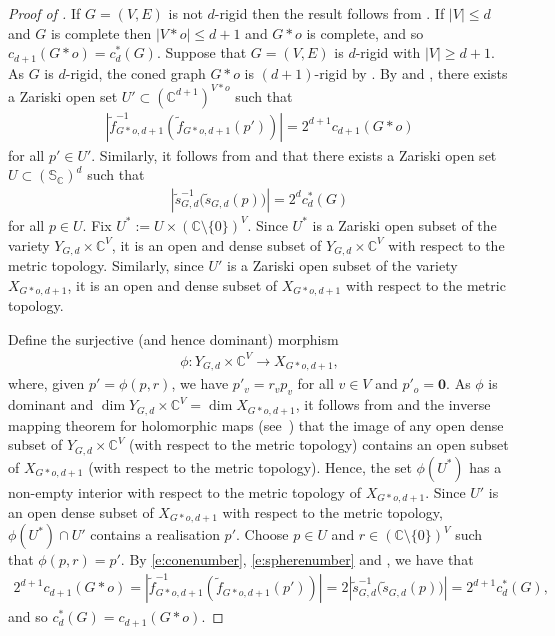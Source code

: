 \documentclass[11pt]{article}
\theoremstyle{definition}
\numberwithin{equation}{section}
\begin{document}
\begin{proof}[Proof of ]
	If $G=(V,E)$ is not $d$-rigid then the result follows from .
	If $|V| \leq d$ and $G$ is complete then $|V*o| \leq d+1$ and $G*o$ is complete,
	and so $c_{d+1}(G*o) = c^*_d(G)$.
	Suppose that $G=(V,E)$ is $d$-rigid with $|V| \geq d+1$.	
	As $G$ is $d$-rigid, the coned graph $G*o$ is $(d+1)$-rigid by .
	By  and ,
	there exists a Zariski open set $U' \subset (\mathbb{C}^{d+1})^{V*o}$ such that
	\begin{align}\label{e:conenumber}
		\left| \tilde{f}_{G*o,d+1}^{-1} \left(\tilde{f}_{G*o,d+1}(p') \right) \right| = 2^{d+1} c_{d+1}(G*o)
	\end{align}
	for all $p' \in U'$.
	Similarly, it follows from  and  that there exists a Zariski open set $U \subset (\mathbb{S}_\mathbb{C})^{d}$ such that
	\begin{align}\label{e:spherenumber}
		\left| \tilde{s}_{G,d}^{-1} \Big(\tilde{s}_{G,d}(p) \Big) \right| = 2^{d} c_{d}^*(G)
	\end{align}
	for all $p \in U$.
	Fix $U^* := U \times (\mathbb{C} \setminus \{0\})^V$.
	Since $U^*$ is a Zariski open subset of the variety $Y_{G,d} \times \mathbb{C}^V$,
	it is an open and dense subset of $Y_{G,d} \times \mathbb{C}^V$ with respect to the metric topology.
	Similarly,
	since $U'$ is a Zariski open subset of the variety $ X_{G *o,d+1}$,
	it is an open and dense subset of $X_{G *o,d+1}$ with respect to the metric topology.
	
	Define the surjective (and hence dominant) morphism 
	\begin{align*}
		\phi : Y_{G,d} \times \mathbb{C}^V \rightarrow X_{G *o,d+1},
	\end{align*}
	where, given $p'= \phi(p,r)$,
	we have $p'_v=r_vp_v$ for all $v \in V$ and $p'_o=\mathbf{0}$.
	As $\phi$ is dominant and $\dim Y_{G,d} \times \mathbb{C}^V = \dim X_{G *o,d+1}$,
	it follows from  and the inverse mapping theorem for holomorphic maps (see~\cite[Theorem 7.5]{FG02}) that the image of any open dense subset of $Y_{G,d} \times \mathbb{C}^V$ (with respect to the metric topology) contains an open subset of $X_{G*o,d+1}$ (with respect to the metric topology).
	Hence, the set $\phi( U^*)$ has a non-empty interior with respect to the metric topology of $X_{G*o,d+1}$.
	Since $U'$ is an open dense subset of $X_{G*o,d+1}$ with respect to the metric topology,
	$\phi( U^*) \cap U'$ contains a realisation $p'$.
	Choose $p \in U$ and $r \in (\mathbb{C}\setminus \{0\})^V$ such that $\phi(p,r) = p'$.
	By \eqref{e:conenumber}, \eqref{e:spherenumber} and ,
	we have that
	\begin{align*}
		2^{d+1} c_{d+1}(G*o) =\left| \tilde{f}_{G*o,d+1}^{-1}\left(\tilde{f}_{G*o,d+1}(p') \right) \right| = 2 \left| \tilde{s}_{G,d}^{-1}\Big(\tilde{s}_{G,d}(p) \Big) \right|= 2^{d+1} c^*_{d}(G),
	\end{align*}
	and so $c^*_{d}(G) = c_{d+1}(G*o)$.
\end{proof}
\end{document}
